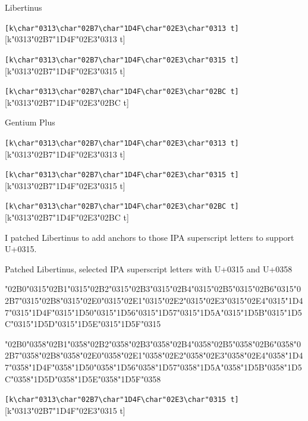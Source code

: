 \documentclass[landscape]{article}
\newcommand{\gs}{\hspace{0.5mm}}	%
\begin{document}
Libertinus

\verb|[k\char"0313\char"02B7\char"1D4F\char"02E3\char"0313 t]| 
[k\char"0313\char"02B7\char"1D4F\char"02E3\char"0313 t]

\verb|[k\char"0313\char"02B7\char"1D4F\char"02E3\char"0315 t]|
[k\char"0313\char"02B7\char"1D4F\char"02E3\char"0315 t]

\verb|[k\char"0313\char"02B7\char"1D4F\char"02E3\char"02BC t]|
[k\char"0313\char"02B7\char"1D4F\char"02E3\char"02BC t]

Gentium Plus

{\Gentium
\verb|[k\char"0313\char"02B7\char"1D4F\char"02E3\char"0313 t]| 
[k\char"0313\char"02B7\char"1D4F\char"02E3\char"0313 t]

\verb|[k\char"0313\char"02B7\char"1D4F\char"02E3\char"0315 t]|
[k\char"0313\char"02B7\char"1D4F\char"02E3\char"0315 t]

\verb|[k\char"0313\char"02B7\char"1D4F\char"02E3\char"02BC t]|
[k\char"0313\char"02B7\char"1D4F\char"02E3\char"02BC t]
}

I patched Libertinus to add anchors to those IPA superscript letters to support U+0315.

Patched Libertinus, selected IPA superscript letters with U+0315 and U+0358

{\LibertinusSerifPatch
	\char"02B0\char"0315\gs \char"02B1\char"0315\gs \char"02B2\char"0315\gs \char"02B3\char"0315\gs \char"02B4\char"0315\gs \char"02B5\char"0315\gs \char"02B6\char"0315\gs \char"02B7\char"0315\gs \char"02B8\char"0315\gs \char"02E0\char"0315\gs \char"02E1\char"0315\gs \char"02E2\char"0315\gs \char"02E3\char"0315\gs \char"02E4\char"0315\gs \char"1D47\char"0315\gs \char"1D4F\char"0315\gs \char"1D50\char"0315\gs \char"1D56\char"0315\gs \char"1D57\char"0315\gs \char"1D5A\char"0315\gs \char"1D5B\char"0315\gs \char"1D5C\char"0315\gs \char"1D5D\char"0315\gs \char"1D5E\char"0315\gs \char"1D5F\char"0315

	\char"02B0\char"0358\gs \char"02B1\char"0358\gs \char"02B2\char"0358\gs \char"02B3\char"0358\gs \char"02B4\char"0358\gs \char"02B5\char"0358\gs \char"02B6\char"0358\gs \char"02B7\char"0358\gs \char"02B8\char"0358\gs \char"02E0\char"0358\gs \char"02E1\char"0358\gs \char"02E2\char"0358\gs \char"02E3\char"0358\gs \char"02E4\char"0358\gs \char"1D47\char"0358\gs \char"1D4F\char"0358\gs \char"1D50\char"0358\gs \char"1D56\char"0358\gs \char"1D57\char"0358\gs \char"1D5A\char"0358\gs \char"1D5B\char"0358\gs \char"1D5C\char"0358\gs \char"1D5D\char"0358\gs \char"1D5E\char"0358\gs \char"1D5F\char"0358

\verb|[k\char"0313\char"02B7\char"1D4F\char"02E3\char"0315 t]|
[k\char"0313\char"02B7\char"1D4F\char"02E3\char"0315 t]
}
\end{document}
